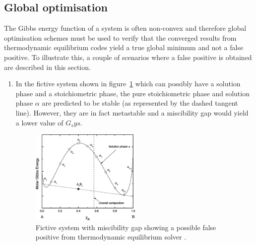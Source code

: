 	\subsection{Global optimisation}\label{sec:opt_theory}
	The Gibbs energy function of a system is often non-convex and therefore global optimisation schemes must be used to verify that the converged results from thermodynamic equilibrium codes yield a true global minimum and not a false positive. To illustrate this, a couple of scenarios where a false positive is obtained are described in this section.
	\begin{enumerate}
		\item In the fictive system shown in figure~\ref{fig:go1} which can possibly have a solution phase and a stoichiometric phase, the pure stoichiometric phase  and solution phase $\alpha$ are predicted to be stable (as represented by the dashed tangent line). However, they are in fact metastable and a miscibility gap would yield a lower value of $G_sys$.
		\begin{figure}[htbp]
		\centering
		\includegraphics[width=0.5\textwidth]{figures/Global_opt1}
		\caption{Fictive system with miscibility gap showing a possible false positive from thermodynamic equilibrium solver \cite{Piro16}.}
		\label{fig:go1}
	\end{figure}


\end{enumerate}

